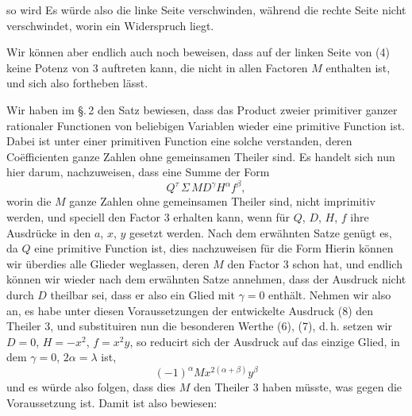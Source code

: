 so wird
Es würde also die linke Seite verschwinden, während die rechte
Seite nicht verschwindet, worin ein Widerspruch liegt.

Wir können aber endlich auch noch beweisen, dass auf der
linken Seite von (4) keine Potenz von 3 auftreten kann, die
nicht in allen Factoren $M$ enthalten ist, und sich also fortheben
lässt.

Wir haben im \S.\,2 den Satz bewiesen, dass das Product
zweier primitiver ganzer rationaler Functionen von beliebigen
Variablen wieder eine primitive Function ist. Dabei ist unter
einer primitiven Function eine solche verstanden, deren Coëfficienten
 ganze Zahlen ohne gemeinsamen Theiler sind. Es handelt
sich nun hier darum, nachzuweisen, dass eine Summe der Form
\[
Q^\tau \, \Sigma \, M D^\gamma H^\alpha f^\beta,
\]
worin die $M$ ganze Zahlen ohne gemeinsamen Theiler sind, nicht
imprimitiv werden, und speciell den Factor 3 erhalten kann,
wenn für $Q$, $D$, $H$, $f$ ihre Ausdrücke in den $a$, $x$, $y$ gesetzt
werden. Nach dem erwähnten Satze genügt es, da $Q$ eine primitive Function ist, dies nachzuweisen für die Form
Hierin können wir überdies alle Glieder weglassen, deren $M$
den Factor 3 schon hat, und endlich können wir wieder nach
dem erwähnten Satze annehmen, dass der Ausdruck nicht durch
$D$ theilbar sei, dass er also ein Glied mit $\gamma = 0$ enthält.
Nehmen wir also an, es habe unter diesen Voraussetzungen der
entwickelte Ausdruck (8) den Theiler 3, und substituiren nun die
besonderen Werthe (6), (7), d.\,h. setzen wir $D = 0$, $H = -x^2$,
$f = x^2 y$, so reducirt sich der Ausdruck auf das einzige Glied,
in dem $\gamma = 0$, $2\alpha = \lambda$ ist,
\[
(-1)^\alpha M x^{2(\alpha + \beta)} y^\beta
\]
und es würde also folgen, dass dies $M$ den Theiler 3 haben
müsste, was gegen die Voraussetzung ist. Damit ist also bewiesen:

